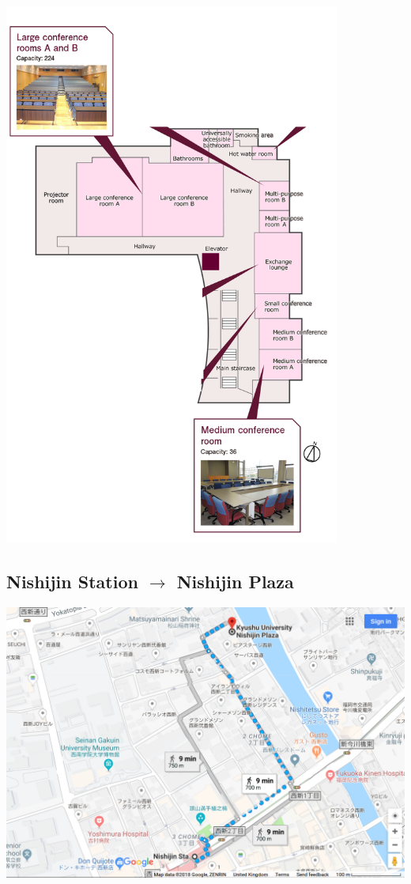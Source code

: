 \noindent\includegraphics[width=0.832\textwidth]{2F.png}
\newpage

\subsection*{Nishijin Station $\rightarrow$ Nishijin Plaza}
\noindent\includegraphics[width=\textwidth]{google_map01.png}

